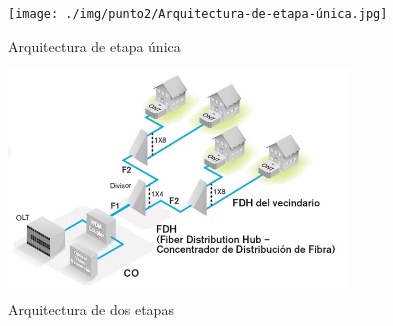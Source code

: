 \begin{figure}[H]
	\centering
	\texttt{[image: ./img/punto2/Arquitectura-de-etapa-única.jpg]}
	\caption{Arquitectura de etapa única}
	\label{fig:Arq_one_layer}
\end{figure}



\begin{figure}[H]
	\centering
	\includegraphics[width=0.80\textwidth]{./img/punto2/Arquitectura-de-dos-etapas.jpg}
	\caption{Arquitectura de dos etapas}
	\label{fig:Arq_two_layers}
\end{figure}





